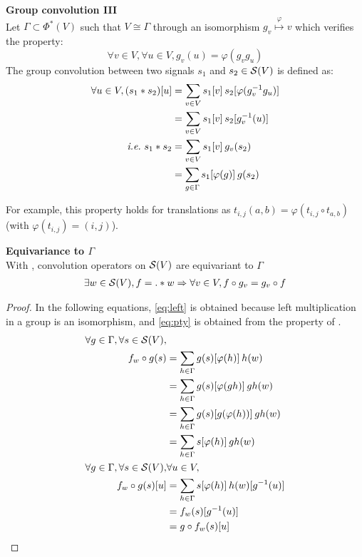 \begin{definition}\textbf{Group convolution III}\\
Let $\Gamma \subset \Phi^*(V)$ such that $V \cong \Gamma$ through an isomorphism $g_v \overset{\varphi}\mapsto v$ which verifies the property: $$\forall v \in V, \forall u \in V, g_v(u) = \varphi(g_vg_u)$$
The group convolution between two signals $s_1$ and $s_2 \in \cs(V)$ is defined as:
\begin{align*}
\forall u \in V, (s_1 \ast s_2) [u] & = \displaystyle \sum_{v \in V} s_1[v] \h{2} s_2[\varphi(g_v^{-1}g_u)]\\
& = \displaystyle \sum_{v \in V} s_1[v] \h{2} s_2[g_v^{-1}(u)]\\
\ie s_1 \ast s_2 & = \displaystyle \sum_{v \in V} s_1[v] \h{2} g_v(s_2)\\
& = \displaystyle \sum_{g \in \Gamma} s_1[\varphi(g)] \h{2} g(s_2) %
\end{align*}
\label{def:conv3}
\end{definition}

\begin{remark}
For example, this property holds for translations as $t_{i,j}(a,b) = \varphi(t_{i,j} \circ t_{a,b})$ (with $\varphi(t_{i,j}) = (i,j)$).
\end{remark}

\begin{proposition}\textbf{Equivariance to $\Gamma$}\\
With , convolution operators on $\cs(V)$ are equivariant to $\Gamma$ \ie
\begin{gather*}
\exists w \in \cs(V), f = . \ast w \Rightarrow \forall v \in V, f \circ g_v = g_v \circ f
\end{gather*}
\label{prop:equi}
\end{proposition}

\begin{proof}
In the following equations, \eqref{eq:left} is obtained because left multiplication in a group is an isomorphism, and \eqref{eq:pty} is obtained from the property of .
\begin{align}
\forall g \in \Gamma, \forall s \in \cs(V), & \nonumber\\
f_w \circ g (s) & = \displaystyle \sum_{h \in \Gamma} g(s)[\varphi(h)] \h{2} h(w)\nonumber\\
 & = \displaystyle \sum_{h \in \Gamma} g(s)[\varphi(gh)] \h{2} gh(w)\label{eq:left}\\
 & = \displaystyle \sum_{h \in \Gamma} g(s)[g(\varphi(h))] \h{2} gh(w)\label{eq:pty}\\
 & = \displaystyle \sum_{h \in \Gamma} s[\varphi(h)] \h{2} gh(w)\nonumber\\
\forall g \in \Gamma, \forall s \in \cs(V), & \forall u \in V, \nonumber\\
f_w \circ g (s) [u] & = \displaystyle \sum_{h \in \Gamma} s[\varphi(h)] \h{2} h(w)[g^{-1}(u)]\nonumber\\
& = f_w (s) [g^{-1}(u)]\nonumber\\
& = g \circ f_w (s) [u]\nonumber
\end{align}
\end{proof}

